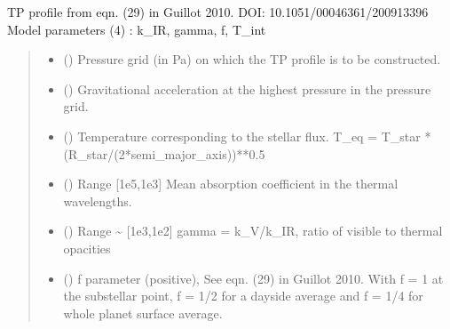 \documentclass[letterpaper,10pt,english]{sphinxmanual}
\begin{document}
\begin{fulllineitems}
\label{\detokenize{api:nemesispy.TP_Guillot}}
\pysigstartsignatures
{}
\pysigstopsignatures
\sphinxAtStartPar
TP profile from eqn. (29) in Guillot 2010.
DOI: 10.1051/0004\sphinxhyphen{}6361/200913396
Model parameters (4) : k\_IR, gamma, f, T\_int
\begin{quote}\begin{description}
\begin{itemize}
\item {} 
\sphinxAtStartPar
{} () \textendash{} Pressure grid (in Pa) on which the TP profile is to be constructed.

\item {} 
\sphinxAtStartPar
{} () \textendash{} Gravitational acceleration at the highest pressure in the pressure
grid.

\item {} 
\sphinxAtStartPar
{} () \textendash{} Temperature corresponding to the stellar flux.
T\_eq = T\_star * (R\_star/(2*semi\_major\_axis))**0.5

\item {} 
\sphinxAtStartPar
{} () \textendash{} Range {[}1e\sphinxhyphen{}5,1e3{]}
Mean absorption coefficient in the thermal wavelengths.

\item {} 
\sphinxAtStartPar
{} () \textendash{} Range \textasciitilde{} {[}1e\sphinxhyphen{}3,1e2{]}
gamma = k\_V/k\_IR, ratio of visible to thermal opacities

\item {} 
\sphinxAtStartPar
{} () \textendash{} f parameter (positive), See eqn. (29) in Guillot 2010.
With f = 1 at the substellar point, f = 1/2 for a
day\sphinxhyphen{}side average and f = 1/4 for whole planet surface average.


\end{itemize}
\end{description}
\end{quote}
\end{fulllineitems}
\end{document}
